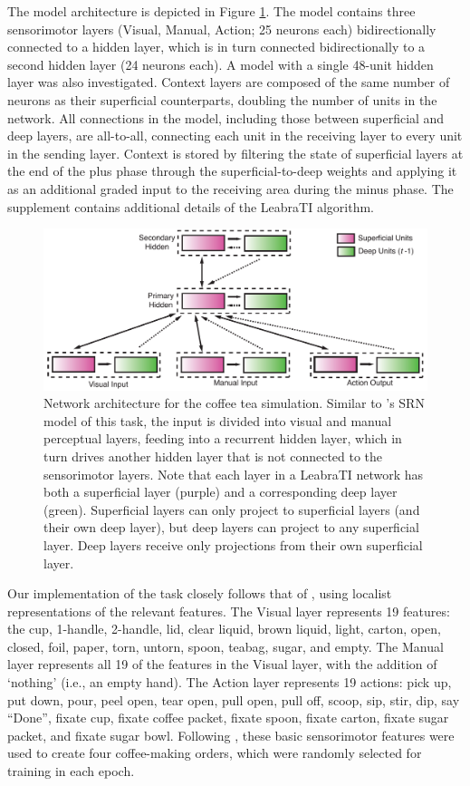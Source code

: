 \documentclass[10pt,letterpaper]{article}
\numberwithin{equation}{section}
\begin{document}
The model architecture is depicted in Figure \ref{fig:coffeenet}. The model contains three sensorimotor layers (Visual, Manual, Action; 25 neurons each) bidirectionally connected to a hidden layer, which is in turn connected bidirectionally to a second hidden layer (24 neurons each). A model with a single 48-unit hidden layer was also investigated. Context layers are composed of the same number of neurons as their superficial counterparts, doubling the number of units in the network. All connections in the model, including those between superficial and deep layers, are all-to-all, connecting each unit in the receiving layer to every unit in the sending layer. Context is stored by filtering the state of superficial layers at the end of the plus phase through the superficial-to-deep weights and applying it as an additional graded input to the receiving area during the minus phase. The supplement contains additional details of the LeabraTI algorithm.


\begin{figure}[h]
  \centering
  \includegraphics[width=\textwidth]{figs/coffee_tea_arch}
  \caption{\small{Network architecture for the coffee tea simulation. Similar to \protect{}'s SRN model of this task, the input is divided into visual and manual perceptual layers, feeding into a recurrent hidden layer, which in turn drives another hidden layer that is not connected to the sensorimotor layers. Note that each layer in a LeabraTI network has both a superficial layer (purple) and a corresponding deep layer (green). Superficial layers can only project to superficial layers (and their own deep layer), but deep layers can project to any superficial layer. Deep layers receive only projections from their own superficial layer.}}
  \label{fig:coffeenet}
\end{figure}

Our implementation of the task closely follows that of , using localist representations of the relevant features. The Visual layer represents 19 features: the cup, 1-handle, 2-handle, lid, clear liquid, brown liquid, light, carton, open, closed, foil, paper, torn, untorn, spoon, teabag, sugar, and empty. The Manual layer represents all 19 of the features in the Visual layer, with the addition of `nothing' (i.e., an empty hand). The Action layer represents 19 actions: pick up, put down, pour, peel open, tear open, pull open, pull off, scoop, sip, stir, dip, say ``Done'', fixate cup, fixate coffee packet, fixate spoon, fixate carton, fixate sugar packet, and fixate sugar bowl. Following , these basic sensorimotor features were used to create four coffee-making orders, which were randomly selected for training in each epoch.
\end{document}
